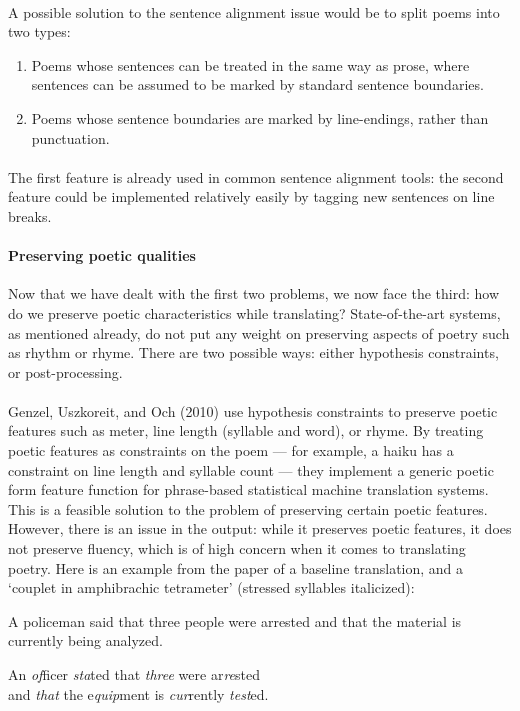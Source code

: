 \paragraph{}{A possible solution to the sentence alignment issue would
  be to split poems into two types:}
\begin{enumerate}
\item Poems whose sentences can be treated in the same way as prose,
  where sentences can be assumed to be marked by standard sentence
  boundaries.
\item Poems whose sentence boundaries are marked by line-endings,
  rather than punctuation.
\end{enumerate}
\paragraph{}{The first feature is already used in common sentence
  alignment tools: the second feature could be implemented relatively
  easily by tagging new sentences on line breaks. }

\paragraph{Preserving poetic qualities}{Now that we have dealt with
  the first two problems, we now face the third: how do we preserve
  poetic characteristics while translating? State-of-the-art systems,
  as mentioned already, do not put any weight on preserving aspects of
  poetry such as rhythm or rhyme. There are two possible ways: either
  hypothesis constraints, or post-processing.}
\paragraph{}{Genzel, Uszkoreit, and Och (2010) \cite{genzel} use
  hypothesis constraints to preserve poetic features such as meter,
  line length (syllable and word), or rhyme. By treating poetic
  features as constraints on the poem --- for example, a haiku has a
  constraint on line length and syllable count --- they implement a
  generic poetic form feature function for phrase-based statistical
  machine translation systems. This is a feasible solution to the
  problem of preserving certain poetic features. However, there is an
  issue in the output: while it preserves poetic features, it does not
  preserve fluency, which is of high concern when it comes to
  translating poetry. Here is an example from the paper of a baseline
  translation, and a `couplet in amphibrachic tetrameter' (stressed
  syllables italicized): \\}
\begin{displayquote}
  A policeman said that three people were arrested and that the
  material is currently being analyzed. 
\end{displayquote}
\begin{displayquote}
  An {\it of}ficer {\it sta}ted that {\it three} were ar{\it re}sted \\
  and {\it that} the e{\it quip}ment is {\it cur}rently {\it test}ed.
\end{displayquote}

